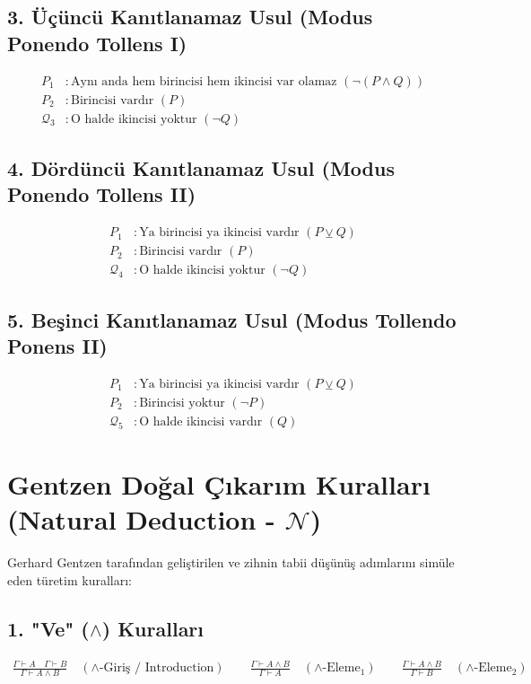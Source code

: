 \documentclass[11pt, a4paper]{article}
\begin{document}
\subsection{3. Üçüncü Kanıtlanamaz Usul (Modus Ponendo Tollens I)}
\begin{align}
P_1 &: \text{Aynı anda hem birincisi hem ikincisi var olamaz } (\neg(P \land Q)) \\
P_2 &: \text{Birincisi vardır } (P) \\
\mathcal{Q}_{3} &: \text{O halde ikincisi yoktur } (\neg Q)
\end{align}

\subsection{4. Dördüncü Kanıtlanamaz Usul (Modus Ponendo Tollens II)}
\begin{align}
P_1 &: \text{Ya birincisi ya ikincisi vardır } (P \veebar Q) \\
P_2 &: \text{Birincisi vardır } (P) \\
\mathcal{Q}_{4} &: \text{O halde ikincisi yoktur } (\neg Q)
\end{align}

\subsection{5. Beşinci Kanıtlanamaz Usul (Modus Tollendo Ponens II)}
\begin{align}
P_1 &: \text{Ya birincisi ya ikincisi vardır } (P \veebar Q) \\
P_2 &: \text{Birincisi yoktur } (\neg P) \\
\mathcal{Q}_{5} &: \text{O halde ikincisi vardır } (Q)
\end{align}

\section{Gentzen Doğal Çıkarım Kuralları (Natural Deduction - $\mathcal{N}$)}

Gerhard Gentzen tarafından geliştirilen ve zihnin tabii düşünüş adımlarını simüle eden türetim kuralları:

\subsection{1. "Ve" ($\land$) Kuralları}
\begin{align}
\frac{\Gamma \vdash A \quad \Gamma \vdash B}{\Gamma \vdash A \land B} \quad (\land\text{-Giriş / Introduction}) \qquad
\frac{\Gamma \vdash A \land B}{\Gamma \vdash A} \quad (\land\text{-Eleme}_1) \qquad
\frac{\Gamma \vdash A \land B}{\Gamma \vdash B} \quad (\land\text{-Eleme}_2)
\end{align}
\end{document}
